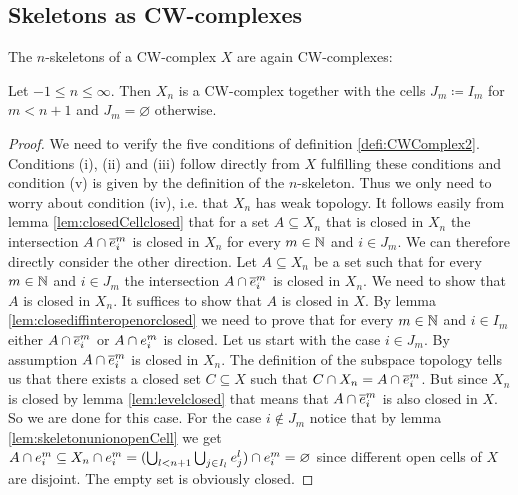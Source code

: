 \subsection{Skeletons as CW-complexes}

The $n$-skeletons of a CW-complex $X$ are again CW-complexes: 

\begin{lem} \label{lem:levelcwcomplex}
    Let $-1 \le n \le \infty$. 
    Then $X_n$ is a CW-complex together with the cells $J_m \coloneq I_m$ for $m < n + 1$ and $J_m = \varnothing$ otherwise.
\end{lem}
\begin{proof}
    We need to verify the five conditions of definition \ref{defi:CWComplex2}.
    Conditions (i), (ii) and (iii) follow directly from $X$ fulfilling these conditions and condition (v) is given by the definition of the $n$-skeleton. 
    Thus we only need to worry about condition (iv), i.e. that $X_n$ has weak topology. 
    It follows easily from lemma \ref{lem:closedCellclosed} that for a set $A \subseteq X_n$ that is closed in $X_n$ the intersection $A \cap \closedCell{m}{i}$ is closed in $X_n$ for every $m \in \bN$ and $i \in J_m$. 
    We can therefore directly consider the other direction. 
    Let $A \subseteq X_n$ be a set such that for every $m \in \bN$ and $i \in J_m$ the intersection $A \cap \closedCell{m}{i}$ is closed in $X_n$. 
    We need to show that $A$ is closed in $X_n$. 
    It suffices to show that $A$ is closed in $X$. 
    By lemma \ref{lem:closediffinteropenorclosed} we need to prove that for every $m \in \bN$ and $i \in I_m$ either $A \cap \closedCell{m}{i}$ or $A \cap \openCell{m}{i}$ is closed. 
    Let us start with the case $i \in J_m$. 
    By assumption $A \cap \closedCell{m}{i}$ is closed in $X_n$. 
    The definition of the subspace topology tells us that there exists a closed set $C \subseteq X$ such that $C \cap X_n = A \cap \closedCell{m}{i}$. 
    But since $X_n$ is closed by lemma \ref{lem:levelclosed} that means that $A \cap \closedCell{m}{i}$ is also closed in $X$. 
    So we are done for this case. 
    For the case $i \notin J_m$ notice that by lemma \ref{lem:skeletonunionopenCell} we get $A \cap \openCell{m}{i} \subseteq X_n \cap \openCell{m}{i} = (\bigcup_{l < n + 1}\bigcup_{j \in I_l}\openCell{l}{j}) \cap \openCell{m}{i} = \varnothing$ since different open cells of $X$ are disjoint. 
    The empty set is obviously closed.
\end{proof}